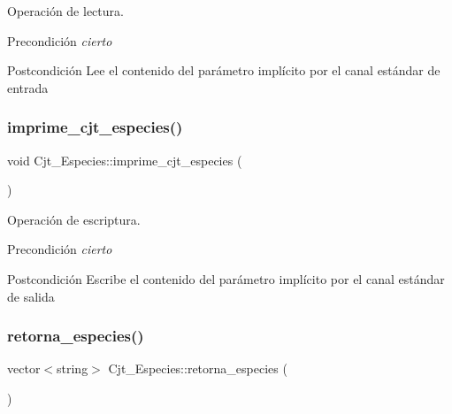 Operación de lectura. 

\begin{DoxyPrecond}{Precondición}
{\itshape cierto} 
\end{DoxyPrecond}
\begin{DoxyPostcond}{Postcondición}
Lee el contenido del parámetro implícito por el canal estándar de entrada 
\end{DoxyPostcond}
\mbox{\label{class_cjt___especies_a61b0168970e926d3a27faf3f31ad2869}} 
\subsubsection{\texorpdfstring{imprime\+\_\+cjt\+\_\+especies()}{imprime\_cjt\_especies()}}
{\footnotesize\ttfamily void Cjt\+\_\+\+Especies\+::imprime\+\_\+cjt\+\_\+especies (\begin{DoxyParamCaption}{ }\end{DoxyParamCaption})}



Operación de escriptura. 

\begin{DoxyPrecond}{Precondición}
{\itshape cierto} 
\end{DoxyPrecond}
\begin{DoxyPostcond}{Postcondición}
Escribe el contenido del parámetro implícito por el canal estándar de salida 
\end{DoxyPostcond}
\mbox{\label{class_cjt___especies_aa06bb16bd1733ed2985bb312d3c8d42b}} 
\subsubsection{\texorpdfstring{retorna\+\_\+especies()}{retorna\_especies()}}
{\footnotesize\ttfamily vector$<$string$>$ Cjt\+\_\+\+Especies\+::retorna\+\_\+especies (\begin{DoxyParamCaption}{ }\end{DoxyParamCaption})}



